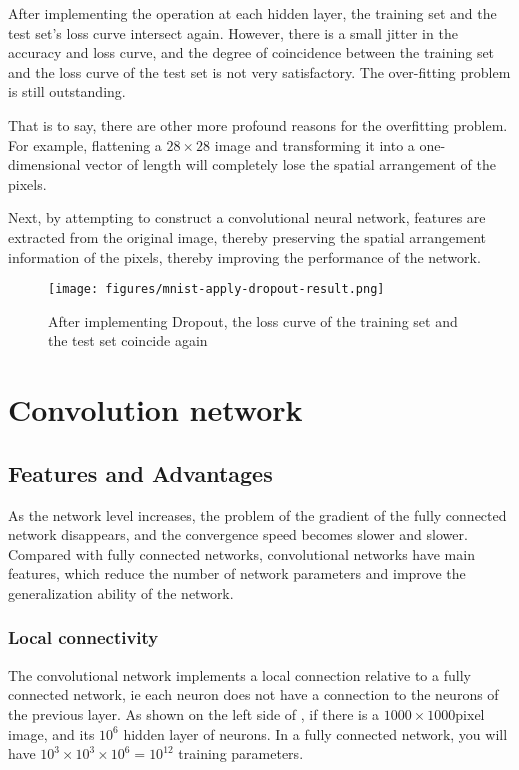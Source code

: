 \begin{content}
\begin{content}
After implementing the  operation at each hidden layer, the training set and the test set's loss curve intersect again. However, there is a small jitter in the accuracy and loss curve, and the degree of coincidence between the training set and the loss curve of the test set is not very satisfactory. The over-fitting problem is still outstanding.

That is to say, there are other more profound reasons for the overfitting problem. For example, flattening a $28\times 28$ image and transforming it into a one-dimensional vector of length  will completely lose the spatial arrangement of the pixels.

Next, by attempting to construct a convolutional neural network, features are extracted from the original image, thereby preserving the spatial arrangement information of the pixels, thereby improving the performance of the network.

\begin{figure}[H]
  \centering
  \texttt{[image: figures/mnist-apply-dropout-result.png]}
  \caption{After implementing Dropout, the loss curve of the training set and the test set coincide again}
  \label{fig:mnist-apply-dropout-result}
\end{figure}

\end{content}


\section{Convolution network}
\begin{content}


\subsection{Features and Advantages}

As the network level increases, the problem of the gradient of the fully connected network disappears, and the convergence speed becomes slower and slower. Compared with fully connected networks, convolutional networks have  main features, which reduce the number of network parameters and improve the generalization ability of the network.


\subsubsection{Local connectivity}
The convolutional network implements a local connection relative to a fully connected network, ie each neuron does not have a connection to the neurons of the previous layer. As shown on the left side of , if there is a $1000\times 1000 $pixel image, and its $10^6$ hidden layer of neurons. In a fully connected network, you will have $10^3\times 10^3 \times 10^6 = 10^{12} $ training parameters.


\end{content}
\end{content}
